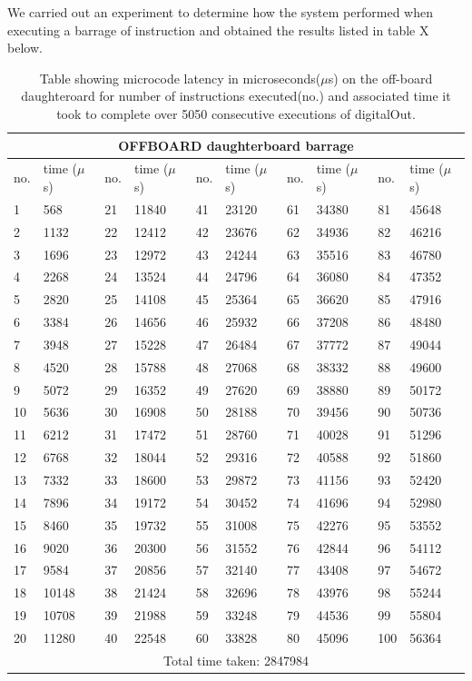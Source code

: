 We carried out an experiment to determine how the system performed when executing a barrage of instruction and obtained the results listed in table X below. 
\begin{table}
	\centering
	\caption{Table showing microcode latency in microseconds($\mu$s) on the off-board daughteroard for number of instructions executed(no.) and associated time it took to complete over 5050 consecutive executions of digitalOut.}
	
	\begin{tabular}{|l|l||l|l||l|l||l|l||l|l||}
	\toprule
 \multicolumn{10}{c}{\textbf{OFFBOARD daughterboard barrage}} \\\hline


no. & time ($\mu$s)& no. & time ($\mu$s)& no. & time ($\mu$s)& no. & time ($\mu$s)& no. & time ($\mu$s) \\\hline
1 & 568 & 21 & 11840 & 41 & 23120 & 61 & 34380 & 81 & 45648 \\\hline
2 & 1132 & 22 & 12412 & 42 & 23676 & 62 & 34936 & 82 & 46216 \\\hline
3 & 1696 & 23 & 12972 & 43 & 24244 & 63 & 35516 & 83 & 46780 \\\hline
4 & 2268 & 24 & 13524 & 44 & 24796 & 64 & 36080 & 84 & 47352 \\\hline
5 & 2820 & 25 & 14108 & 45 & 25364 & 65 & 36620 & 85 & 47916 \\\hline
6 & 3384 & 26 & 14656 & 46 & 25932 & 66 & 37208 & 86 & 48480 \\\hline
7 & 3948 & 27 & 15228 & 47 & 26484 & 67 & 37772 & 87 & 49044 \\\hline
8 & 4520 & 28 & 15788 & 48 & 27068 & 68 & 38332 & 88 & 49600 \\\hline
9 & 5072 & 29 & 16352 & 49 & 27620 & 69 & 38880 & 89 & 50172 \\\hline
10 & 5636 & 30 & 16908 & 50 & 28188 & 70 & 39456 & 90 & 50736 \\\hline
11 & 6212 & 31 & 17472 & 51 & 28760 & 71 & 40028 & 91 & 51296 \\\hline
12 & 6768 & 32 & 18044 & 52 & 29316 & 72 & 40588 & 92 & 51860 \\\hline
13 & 7332 & 33 & 18600 & 53 & 29872 & 73 & 41156 & 93 & 52420 \\\hline
14 & 7896 & 34 & 19172 & 54 & 30452 & 74 & 41696 & 94 & 52980 \\\hline
15 & 8460 & 35 & 19732 & 55 & 31008 & 75 & 42276 & 95 & 53552 \\\hline
16 & 9020 & 36 & 20300 & 56 & 31552 & 76 & 42844 & 96 & 54112 \\\hline
17 & 9584 & 37 & 20856 & 57 & 32140 & 77 & 43408 & 97 & 54672 \\\hline
18 & 10148 & 38 & 21424 & 58 & 32696 & 78 & 43976 & 98 & 55244 \\\hline
19 & 10708 & 39 & 21988 & 59 & 33248 & 79 & 44536 & 99 & 55804 \\\hline
20 & 11280 & 40 & 22548 & 60 & 33828 & 80 & 45096 & 100 & 56364 \\\hline
\multicolumn{10}{c}{Total time taken: 2847984} \\\hline
\end{tabular}
\end{table}
